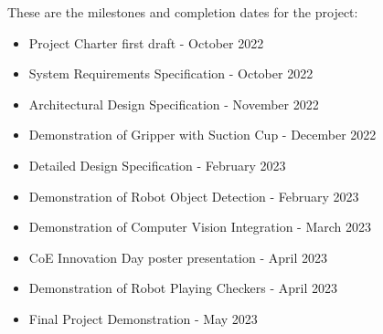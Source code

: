 These are the milestones and completion dates for the project:
\begin{itemize}
  \item Project Charter first draft - October 2022
  \item System Requirements Specification - October 2022
  \item Architectural Design Specification - November 2022
  \item Demonstration of Gripper with Suction Cup - December 2022
  \item Detailed Design Specification - February 2023
  \item Demonstration of Robot Object Detection - February 2023
  \item Demonstration of Computer Vision Integration - March 2023
  \item CoE Innovation Day poster presentation - April 2023
  \item Demonstration of Robot Playing Checkers - April 2023
  \item Final Project Demonstration - May 2023
\end{itemize}